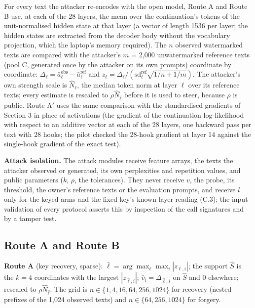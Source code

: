 \documentclass[11pt,letterpaper]{article}
\begin{document}
For every text the attacker re-encodes with the open model, Route A and Route B use, at each of the 28 layers, the mean over the continuation's tokens of the unit-normalised hidden state at that layer (a vector of length 1536 per layer; the hidden states are extracted from the decoder body without the vocabulary projection, which the laptop's memory required). The \(n\) observed watermarked texts are compared with the attacker's \(m\) = 2,000 unwatermarked reference texts (pool C, generated once by the attacker on its own prompts) coordinate by coordinate: \(\Delta_{\ell} = \bar a^{\text{obs}}_{\ell} - \bar a^{\text{ref}}_{\ell}\) and \(z_{\ell} = \Delta_{\ell} / (\text{sd}^{\text{ref}}_{\ell} \sqrt{1/n + 1/m})\). The attacker's own strength scale is \(\hat N_\ell\), the median token norm at layer \(\ell\) over its reference texts; every estimate is rescaled to \(\rho \hat N_{\hat\ell}\) before it is used to steer, because \(\rho\) is public. Route A\ensuremath{'} uses the same comparison with the standardised gradients of Section 3 in place of activations (the gradient of the continuation log-likelihood with respect to an additive vector at each of the 28 layers, one backward pass per text with 28 hooks; the pilot checked the 28-hook gradient at layer 14 against the single-hook gradient of the exact test).

\textbf{Attack isolation.} The attack modules receive feature arrays, the texts the attacker observed or generated, its own perplexities and repetition values, and public parameters (\(k\), \(\rho\), the tolerances). They never receive \(v\), the probe, its threshold, the owner's reference texts or the evaluation prompts, and receive \(l\) only for the keyed arms and the fixed key's known-layer reading (C.3); the input validation of every protocol asserts this by inspection of the call signatures and by a tamper test.

\hypertarget{route-a-and-route-b}{%
\subsection{Route A and Route B}\label{route-a-and-route-b}}

\textbf{Route A} (key recovery, sparse): \(\hat\ell = \arg\max_\ell \max_i |z_{\ell, i}|\); the support \(\hat S\) is the \(k = 4\) coordinates with the largest \(|z_{\hat\ell, i}|\); \(\hat v_i = \Delta_{\hat\ell, i}\) on \(\hat S\) and 0 elsewhere; rescaled to \(\rho \hat N_{\hat\ell}\). The grid is \(n \in \{1, 4, 16, 64, 256, 1024\}\) for recovery (nested prefixes of the 1,024 observed texts) and \(n \in \{64, 256, 1024\}\) for forgery.
\end{document}
